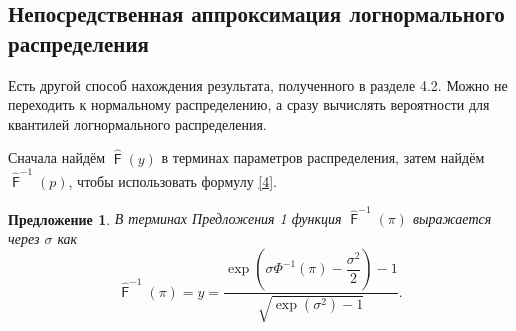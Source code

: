 \documentclass[12pt]{article}
\newtheorem{proposition}[theorem]{Предложение}
\DeclareMathOperator{\F}{\mathsf{F}}
\begin{document}
	\subsection{Непосредственная аппроксимация логнормального распределения}
	
	Есть другой способ нахождения результата, полученного в разделе 4.2. Можно не переходить к нормальному распределению, а сразу вычислять вероятности для квантилей логнормального распределения.
	
	Сначала найдём $\hat{\F}(y)$ в терминах параметров распределения, затем найдём $\hat{\F}^{-1}(p)$, чтобы использовать формулу \eqref{4}.
	
	\begin{proposition}\label{pr2}
		В терминах Предложения 1 функция $\hat{\F}^{-1}(\pi)$ выражается через $\sigma$ как
		\begin{equation}
			\displaystyle{\hat{\F}^{-1}(\pi) = y = \frac{\exp\left( \sigma\Phi^{-1}(\pi) - \dfrac{\sigma^{2} }{2}\right) -1}{\sqrt{\exp(\sigma ^{2})-1}}}.
		\end{equation}\label{12}
	\end{proposition}
\end{document}
